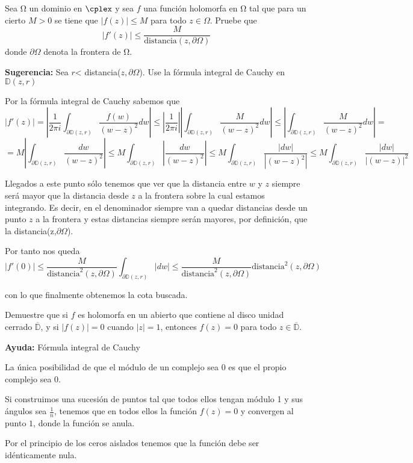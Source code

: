 \begin{problem}[14]
Sea Ω un dominio en $\cplex$ y sea $f$ una función holomorfa en Ω tal que para un cierto $M>0$ se tiene que $|f(z)|\leq M$ para todo $z \in Ω$. Pruebe que
\[|f'(z) | \leq \frac{M}{\text{distancia}(z, \partial Ω)}\]
donde $\partial Ω$ denota la frontera de Ω.

\textbf{Sugerencia:} Sea $r$< distancia($z,\partial Ω$). Use la fórmula integral de Cauchy en $\mathbb{D}(z,r)$

\solution
{}

Por la fórmula integral de Cauchy sabemos que
\[|f'(z)| = \left| \frac{1}{2πi}\int_{\partial \mathbb{D}(z,r)}\frac{f(w)}{(w-z)^2}dw \right|\leq  \left| \frac{1}{2πi}\right| \left|\int_{\partial \mathbb{D}(z,r)}\frac{M}{(w-z)^2}dw\right|\leq\left|\int_{\partial \mathbb{D}(z,r)}\frac{M}{(w-z)^2}dw\right|=\]
\[=M \left|\int_{\partial \mathbb{D}(z,r)}\frac{dw}{(w-z)^2}\right|\leq M \int_{\partial \mathbb{D}(z,r)}\left|\frac{dw}{(w-z)^2}\right| \leq M \int_{\partial \mathbb{D}(z,r)}\frac{|dw|}{|(w-z)^2|} \leq M \int_{\partial \mathbb{D}(z,r)}\frac{|dw|}{|(w-z)|^2}\]

Llegados a este punto sólo tenemos que ver que la distancia entre $w$ y $z$ siempre será mayor que la distancia desde $z$ a la frontera sobre la cual estamos integrando. Es decir, en el denominador siempre van a quedar distancias desde un punto $z$ a la frontera y estas distancias siempre serán mayores, por definición, que la distancia(z,$\partial Ω$).

Por tanto nos queda
\[|f'(0)| \leq \frac{M}{\text{distancia}^2(z, \partial Ω)} \int_{\partial \mathbb{D}(z,r)}|dw|\leq \frac{M}{\text{distancia}^2(z, \partial Ω)}\text{distancia}^2(z, \partial Ω)\]

con lo que finalmente obtenemos la cota buscada.

\end{problem}

\begin{problem}[15]
Demuestre que si $f$ es holomorfa en un abierto que contiene al disco unidad cerrado $\overline{\mathbb{D}}$, y si $|f(z)|=0$ cuando $|z|=1$, entonces $f(z)=0$ para todo $z \in \overline{\mathbb{D}}$.

\textbf{Ayuda:} Fórmula integral de Cauchy

\solution


La única posibilidad de que el módulo de un complejo sea 0 es que el propio complejo sea 0.

Si construimos una sucesión de puntos tal que todos ellos tengan módulo 1 y sus ángulos sea $\frac{1}{n}$, tenemos que en todos ellos la función $f(z)=0$ y convergen al punto $1$, donde la función se anula.

Por el principio de los ceros aislados tenemos que la función debe ser idénticamente nula.

\end{problem}


